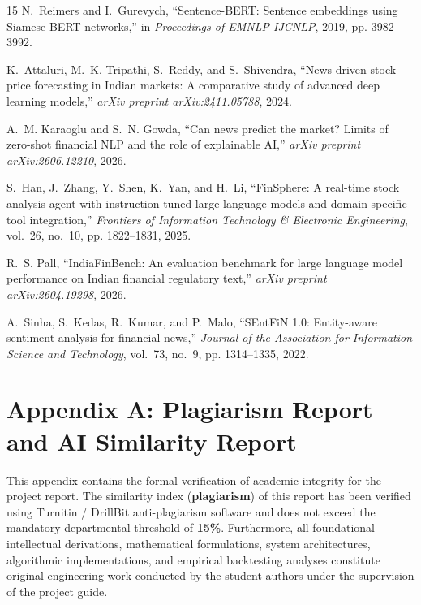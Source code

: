 \documentclass{article}
\begin{document}
\begin{thebibliography}{15}
	N.~Reimers and I.~Gurevych, ``Sentence-BERT: Sentence embeddings using Siamese BERT-networks,'' in \textit{Proceedings of EMNLP-IJCNLP}, 2019, pp. 3982--3992.

	K.~Attaluri, M.~K. Tripathi, S.~Reddy, and S.~Shivendra, ``News-driven stock price forecasting in Indian markets: A comparative study of advanced deep learning models,'' \textit{arXiv preprint arXiv:2411.05788}, 2024.

	A.~M. Karaoglu and S.~N. Gowda, ``Can news predict the market? Limits of zero-shot financial NLP and the role of explainable AI,'' \textit{arXiv preprint arXiv:2606.12210}, 2026.

	S.~Han, J.~Zhang, Y.~Shen, K.~Yan, and H.~Li, ``FinSphere: A real-time stock analysis agent with instruction-tuned large language models and domain-specific tool integration,'' \textit{Frontiers of Information Technology \& Electronic Engineering}, vol.~26, no.~10, pp. 1822--1831, 2025.

	R.~S. Pall, ``IndiaFinBench: An evaluation benchmark for large language model performance on Indian financial regulatory text,'' \textit{arXiv preprint arXiv:2604.19298}, 2026.

	A.~Sinha, S.~Kedas, R.~Kumar, and P.~Malo, ``SEntFiN 1.0: Entity-aware sentiment analysis for financial news,'' \textit{Journal of the Association for Information Science and Technology}, vol.~73, no.~9, pp. 1314--1335, 2022.

	\end{thebibliography} 

	\pagebreak
	\appendix
	\section{Appendix A: Plagiarism Report and AI Similarity Report}
	This appendix contains the formal verification of academic integrity for the project report. The similarity index (\textbf{plagiarism}) of this report has been verified using Turnitin / DrillBit anti-plagiarism software and does not exceed the mandatory departmental threshold of \textbf{15\%}. Furthermore, all foundational intellectual derivations, mathematical formulations, system architectures, algorithmic implementations, and empirical backtesting analyses constitute original engineering work conducted by the student authors under the supervision of the project guide.
\end{document}
